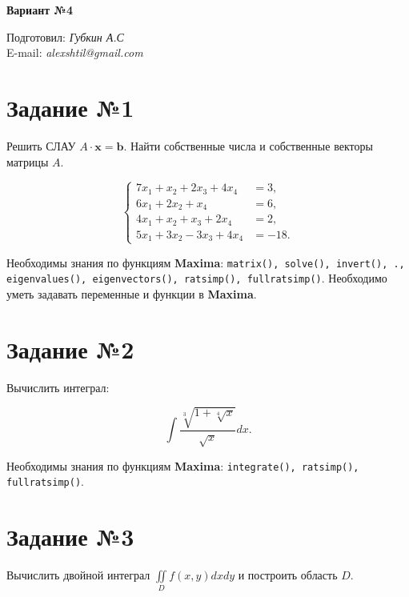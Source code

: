     \begin{center}
        \textbf{\huge Вариант №4}
    \end{center}

    \begin{flushright}
        Подготовил: \textit{Губкин А.С}\\
        E-mail: \textit{alexshtil@gmail.com}\\
    \end{flushright}

    \section*{Задание №1}

    Решить СЛАУ $A \cdot \mathbf{x} = \mathbf{b}$. Найти собственные числа и собственные векторы матрицы $A$.

    \[
        \left\{
            \begin{aligned}
                7 x_{1} + x_{2} + 2 x_{3} + 4 x_{4} &= 3,\\
                6 x_{1} + 2 x_{2} + x_{4} &= 6,\\
                4 x_{1} + x_{2} + x_{3} + 2 x_{4} &= 2,\\
                5 x_{1} + 3 x_{2} - 3 x_{3} + 4 x_{4} &= -18.
            \end{aligned}
        \right.
    \]
    
    Необходимы знания по функциям \textbf{Maxima}: {\tt matrix(), solve(), invert(), ., eigenvalues(), eigenvectors(), ratsimp(), fullratsimp()}. Необходимо уметь задавать переменные и функции в \textbf{Maxima}.

    \section*{Задание №2}

    Вычислить интеграл:

    \[
        \int \frac{\sqrt[3]{1 + \sqrt[4]{x}}}{\sqrt{x}} dx.
    \]

    Необходимы знания по функциям \textbf{Maxima}: {\tt integrate(), ratsimp(), fullratsimp()}.

    \section*{Задание №3}

    Вычислить двойной интеграл $\iint\limits_{D} f(x,y) dx dy$ и построить область $D$.


